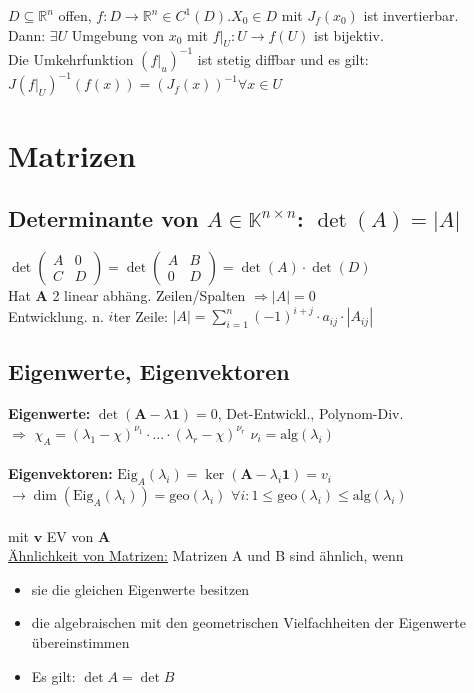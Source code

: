\documentclass[6pt,a4paper]{scrartcl}
\newcommand{\ma}[1]{\ensuremath{\boldsymbol {#1}}}                                              %
\renewcommand{\vec}[1]{\ensuremath{\boldsymbol {#1}}}                                           %
\renewcommand{\emph}[1]{\textbf{#1}}                                                            %
\newcommand{\Ra}[0]{\ensuremath{\Rightarrow}}                                  %
\newcommand{\ra}[0]{\ensuremath{\rightarrow}}                                  %
\newcommand{\C}{\ensuremath{\mathbb C}}
\begin{document}
\begin{multicols*}{4}
    $D \subseteq \mathbb R^n$ offen, $f: D \ra \mathbb R^n \in C^1 (D). X_0 \in D$ mit $J_f (x_0)$ ist invertierbar. \\
    Dann: $\exists U$ Umgebung von $x_0$ mit $f |_U : U \ra f(U)$ ist bijektiv. \\
    Die Umkehrfunktion $(f|_u)^{-1}$ ist stetig diffbar und es gilt: \\
    $J(f|_U)^{-1} (f(x)) = (J_f (x))^{-1} \forall x \in U$

    \section{Matrizen}

    \subsection{Determinante von $A\in \mathbb K^{n\times n}$: $\det(A)=|A|$}

    $\det\begin{pmatrix}A&0\\C&D\end{pmatrix}=\det\begin{pmatrix}A&B\\0&D\end{pmatrix}=\det(A)\cdot\det(D)$ \\
    Hat $\ma A$ 2 linear abhäng. Zeilen/Spalten $\Rightarrow |A|=0$ \\
    Entwicklung. n. $i$ter Zeile: $|A|=\sum\limits_{i=1}^n (-1)^{i+j} \cdot a_{ij} \cdot |A_{ij}|$ \qquad


    \subsection{Eigenwerte, Eigenvektoren}
    \emph{Eigenwerte:} $\det(\ma A - \lambda \ma 1) = 0$, Det-Entwickl., Polynom-Div. \\
    $\Ra$ $\chi_A = (\lambda_1 - \chi)^{\nu_1} \cdot ... \cdot (\lambda_r - \chi)^{\nu_r}$ \quad $\nu_i = \mathrm{alg}(\lambda_i)$\\ \\
    \emph{Eigenvektoren:} $\mathrm{Eig}_A (\lambda_i) = \ker(\ma A - \lambda_i \ma 1) = v_i$\\
    $\ra \dim(\mathrm{Eig}_A (\lambda_i)) = \mathrm{geo}(\lambda_i)$ \quad $\forall i : 1 \le \mathrm{geo}(\lambda_i) \le \mathrm{alg}(\lambda_i)$\\ \\
    \boxed{\ma A \vec v = \lambda \vec v} mit $\vec v$ EV von $\ma A$ \\
    \underline{Ähnlichkeit von Matrizen:} Matrizen A und B sind ähnlich, wenn
    \begin{itemize}
        \item sie die gleichen Eigenwerte besitzen
        \item die algebraischen mit den geometrischen Vielfachheiten der Eigenwerte übereinstimmen
        \item Es gilt: $\det A = \det B$
    \end{itemize}


\end{multicols*}
\end{document}

